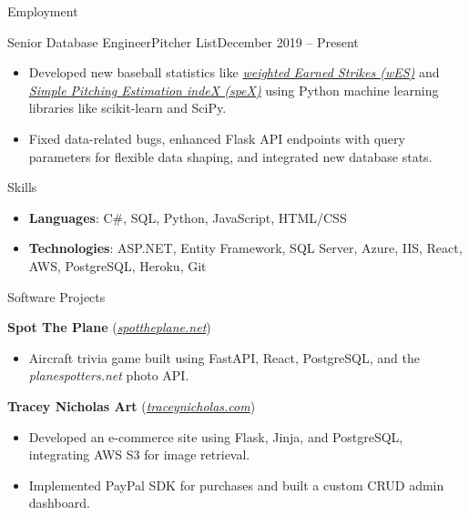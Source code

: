 \documentclass[calibri]{mcdowellcv}
\begin{document}
\begin{cvsection}{Employment}
\begin{cvsubsection}{Senior Database Engineer}{Pitcher List}{December 2019 -- Present}
\begin{itemize}
				\item Developed new baseball statistics like \textit{\color{blue}\href{https://pitcherlist.com/wes-rate-creating-an-improved-csw-rate/}{weighted Earned Strikes (wES)}} and \textit{\color{blue}\href{https://pitcherlist.com/putting-it-all-together-using-spex-as-the-ultimate-pitching-estimator/}{Simple Pitching Estimation indeX (speX)}} using Python machine learning libraries like scikit-learn and SciPy.
				\item Fixed data-related bugs, enhanced Flask API endpoints with query parameters for flexible data shaping, and integrated new database stats.
			\end{itemize}
		\end{cvsubsection}
	\end{cvsection}

	\begin{cvsection}{Skills}
		\begin{cvsubsection}{}{}{}	
			\begin{itemize}
				\item \textbf{Languages}: C\#, SQL, Python, JavaScript, HTML/CSS
				\item \textbf{Technologies}: ASP.NET, Entity Framework, SQL Server, Azure, IIS, React, AWS, PostgreSQL, Heroku, Git
			\end{itemize}
		\end{cvsubsection}
	\end{cvsection}

	\begin{cvsection}{Software Projects}
		\begin{cvsubsection}{}{}{}
			\textbf{Spot The Plane} (\textit{{\color{blue}\href{https://www.spottheplane.net/}{spottheplane.net}}})
			\begin{itemize}
				\item Aircraft trivia game built using FastAPI, React, PostgreSQL, and the \textit{planespotters.net} photo API.
			\end{itemize}
		\end{cvsubsection}

		\begin{cvsubsection}{}{}{}
			\textbf{Tracey Nicholas Art} (\textit{{\color{blue}\href{https://www.traceynicholas.com/}{traceynicholas.com}}})
			\begin{itemize}
				\item Developed an e-commerce site using Flask, Jinja, and PostgreSQL, integrating AWS S3 for image retrieval.
				\item Implemented PayPal SDK for purchases and built a custom CRUD admin dashboard.
			\end{itemize}
		\end{cvsubsection}
	\end{cvsection}
	
\end{document}
